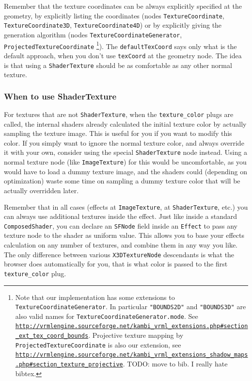 \documentclass{acmsiggraph}                     %
\newcommand*{\myhref}[2]{\texttt{\href{#1}{\nolinkurl{#2}}}}
\begin{document}
Remember that the texture coordinates can be always explicitly specified
at the geometry, by explicitly listing the coordinates (nodes
\texttt{TextureCoordinate}, \texttt{TextureCoordinate3D},
\texttt{TextureCoordinate4D}) or by explicitly giving the generation
algorithm (nodes \texttt{TextureCoordinateGenerator},
\texttt{ProjectedTextureCoordinate} \footnote{
    Note that our implementation has some extensions
    to \texttt{TextureCoordinateGenerator}. In particular
    \texttt{"BOUNDS2D"} and \texttt{"BOUNDS3D"} are also valid names for
    \texttt{TextureCoordinateGenerator.mode}. See
    \myhref{http://vrmlengine.sourceforge.net/kambi\_vrml\_extensions.php\#section\_ext\_tex\_coord\_bounds}{http://vrmlengine.sourceforge.net/kambi_vrml_extensions.php\#section_ext_tex_coord_bounds}.
    Projective texture mapping by \texttt{ProjectedTextureCoordinate}
    is also our extension, see
    \myhref{http://vrmlengine.sourceforge.net/kambi\_vrml\_extensions\_shadow\_maps.php\#section\_texture\_projective}{http://vrmlengine.sourceforge.net/kambi_vrml_extensions_shadow_maps.php\#section_texture_projective}.
    TODO: move to bib. I really hate bibtex.
}).
The \texttt{defaultTexCoord} says only what is the default approach,
when you don't use \texttt{texCoord} at the geometry node.
The idea is that using a \texttt{ShaderTexture} should be as comfortable
as any other normal texture.

\subsubsection{When to use ShaderTexture}

For textures that are not \texttt{ShaderTexture},
when the \texttt{texture\_color} plugs are called,
the internal shaders already calculated the initial texture
color by actually sampling the texture image. This is useful for you if you
want to modify this color. If you simply want to ignore the normal
texture color, and always override it with your own, consider using
the special \texttt{ShaderTexture} node instead. Using
a normal texture node (like \texttt{ImageTexture}) for this
would be uncomfortable, as you would have to load a dummy texture image,
and the shaders could (depending on optimization) waste some time
on sampling a dummy texture color that will be actually overridden later.

Remember that in all cases (effects at \texttt{ImageTexture},
at \texttt{ShaderTexture}, etc.) you can always use additional
textures inside the effect. Just like inside a standard \texttt{ComposedShader},
you can declare an \texttt{SFNode} field inside an \texttt{Effect}
to pass any texture node to the shader as uniform value.
This allows you to base your effects calculation on any number of textures,
and combine them in any way you like. The only difference
between various \texttt{X3DTextureNode} descendants is what the browser
does automatically for you, that is what color is passed
to the first \texttt{texture\_color} plug.
\end{document}
